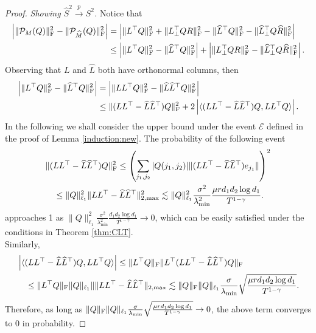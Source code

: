 \documentclass[12pt]{article}
\newcommand\fro[1]{\| #1 \|_{\rm{F}}}
\newcommand{\inp}[2]{\langle #1,#2\rangle}
\def\calE{{\mathcal E}}
\theoremstyle{plain}
\begin{document}
\begin{proof}
    {\it Showing $\widehat{S}^2\overset{p}{\rightarrow} S^2$.} \quad  Notice that
    \begin{align*}
        \left|\fro{\mathcal{P}_M(Q)}^2 - \fro{\mathcal{P}_{\widehat{M}}(Q)}^2\right|&=\left|\fro{L^{\top}Q}^2 + \fro{L_{\perp}^{\top}Q R}^2 - \fro{\widehat{L}^{\top}Q}^2 - \fro{\widehat{L}_{\perp}^{\top}Q \widehat{R}}^2\right| \\
        &\leq \left|\fro{L^{\top}Q}^2 - \fro{\widehat{L}^{\top}Q}^2\right| + \left|\fro{L_{\perp}^{\top}Q R}^2 - \fro{\widehat{L}_{\perp}^{\top}Q \widehat{R}}^2\right|. 
    \end{align*}
    Observing that $L$ and $\widehat{L}$ both have orthonormal columns, then
    \begin{align*}
        \left|\fro{L^{\top}Q}^2 - \fro{\widehat{L}^{\top}Q}^2\right|&=\left|\fro{LL^{\top}Q}^2 - \fro{\widehat{L}\widehat{L}^{\top}Q}^2\right| \\
        &\leq \fro{(LL^{\top} - \widehat{L}\widehat{L}^{\top})Q}^2 + 2\left|\inp{(LL^{\top} - \widehat{L}\widehat{L}^{\top})Q}{LL^{\top}Q}\right|.
    \end{align*}
    In the following we shall consider the upper bound under the event $\calE$ defined in the proof of Lemma \ref{induction:new}. 
    The probability of the following event
    \begin{align*}
        &\fro{(LL^{\top} - \widehat{L}\widehat{L}^{\top})Q}^2 \leq \left(\sum_{j_1,j_2} |Q(j_1,j_2)| \|(LL^{\top} - \widehat{L}\widehat{L}^{\top})e_{j_1}\|\right)^2 \\
        &\quad \leq \|Q\|_{\ell_1}^2 \|LL^{\top} - \widehat{L}\widehat{L}^{\top}\|_{2,\max}^2 \lesssim \|Q\|_{\ell_1}^2\frac{\sigma^2}{\lambda_{\min}^2}\frac{\mu r d_1d_2\log d_1}{T^{1-\gamma}}.
    \end{align*}
    approaches 1 as $\|Q\|_{\ell_1}^2\frac{\sigma^2}{\lambda_{\min}^2}\frac{d_1d_2\log d_1}{T^{1-\gamma}}\rightarrow 0$, which can be easily satisfied under the conditions in Theorem \ref{thm:CLT}. \\ 
    Similarly,
    \begin{align*}
        &\left|\inp{(LL^{\top} - \widehat{L}\widehat{L}^{\top})Q}{LL^{\top}Q}\right|\leq \fro{L^{\top}Q}\fro{L^{\top}(LL^{\top} - \widehat{L}\widehat{L}^{\top})Q} \\
        &\quad \leq \fro{L^{\top}Q}\|Q\|_{\ell_1}\|\|LL^{\top} - \widehat{L}\widehat{L}^{\top}\|_{2,\max} \lesssim \fro{Q}\|Q\|_{\ell_1}\frac{\sigma}{\lambda_{\min}}\sqrt{\frac{\mu r d_1d_2\log d_1}{T^{1-\gamma}}}.
    \end{align*}
    Therefore, as long as $\fro{Q}\|Q\|_{\ell_1}\frac{\sigma}{\lambda_{\min}}\sqrt{\frac{\mu r d_1d_2\log d_1}{T^{1-\gamma}}}\rightarrow 0$, the above term converges to 0 in probability.
    

\end{proof}
\end{document}
